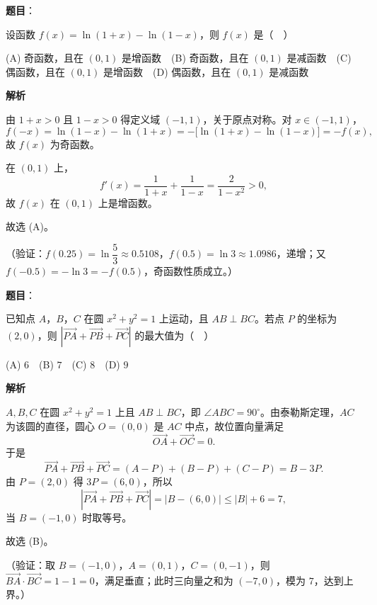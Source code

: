 \begin{answer}

\textbf{题目}：

设函数 \(f(x)=\ln(1+x)-\ln(1-x)\)，则 \(f(x)\) 是（　）

(A) 奇函数，且在 \((0,1)\) 是增函数　(B) 奇函数，且在 \((0,1)\) 是减函数　(C) 偶函数，且在 \((0,1)\) 是增函数　(D) 偶函数，且在 \((0,1)\) 是减函数

\textbf{解析}

由 \(1+x>0\) 且 \(1-x>0\) 得定义域 \((-1,1)\)，关于原点对称。对 \(x\in(-1,1)\)，
\nopagebreak[4]
\[
f(-x)=\ln(1-x)-\ln(1+x)=-\bigl[\ln(1+x)-\ln(1-x)\bigr]=-f(x),
\]
故 \(f(x)\) 为奇函数。

在 \((0,1)\) 上，
\nopagebreak[4]
\[
f'(x)=\dfrac{1}{1+x}+\dfrac{1}{1-x}=\dfrac{2}{1-x^2}>0,
\]
故 \(f(x)\) 在 \((0,1)\) 上是增函数。

故选 (A)。

（验证：\(f(0.25)=\ln\dfrac53\approx0.5108\)，\(f(0.5)=\ln3\approx1.0986\)，递增；又 \(f(-0.5)=-\ln3=-f(0.5)\)，奇函数性质成立。）


\end{answer}
\begin{answer}

\textbf{题目}：

已知点 \(A\)，\(B\)，\(C\) 在圆 \(x^2+y^2=1\) 上运动，且 \(AB\perp BC\)。若点 \(P\) 的坐标为 \((2,0)\)，则 \(\left|\overrightarrow{PA}+\overrightarrow{PB}+\overrightarrow{PC}\right|\) 的最大值为（　）

(A) \(6\)　(B) \(7\)　(C) \(8\)　(D) \(9\)

\textbf{解析}

\(A,B,C\) 在圆 \(x^2+y^2=1\) 上且 \(AB\perp BC\)，即 \(\angle ABC=90^\circ\)。由泰勒斯定理，\(AC\) 为该圆的直径，圆心 \(O=(0,0)\) 是 \(AC\) 中点，故位置向量满足
\nopagebreak[4]
\[
\overrightarrow{OA}+\overrightarrow{OC}=0.
\]
于是
\nopagebreak[4]
\[
\overrightarrow{PA}+\overrightarrow{PB}+\overrightarrow{PC}
=(A-P)+(B-P)+(C-P)=B-3P.
\]
由 \(P=(2,0)\) 得 \(3P=(6,0)\)，所以
\nopagebreak[4]
\[
\left|\overrightarrow{PA}+\overrightarrow{PB}+\overrightarrow{PC}\right|
=\left|B-(6,0)\right|\leqslant|B|+6=7,
\]
当 \(B=(-1,0)\) 时取等号。

故选 (B)。

（验证：取 \(B=(-1,0)\)，\(A=(0,1)\)，\(C=(0,-1)\)，则 \(\overrightarrow{BA}\cdot\overrightarrow{BC}=1-1=0\)，满足垂直；此时三向量之和为 \((-7,0)\)，模为 \(7\)，达到上界。）


\end{answer}
